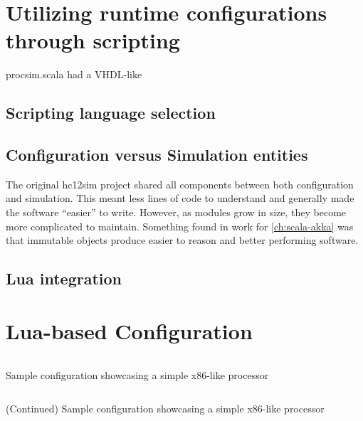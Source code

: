 \section{Utilizing runtime configurations through scripting}

procsim.scala had a VHDL-like


\subsection{Scripting language selection}
\lipsum[1]




\subsection{Configuration versus Simulation entities}

The original hc12sim project shared all components between both configuration and simulation. This meant less lines of code to understand and generally made the software ``easier'' to write. However, as modules grow in size, they become more complicated to maintain. Something found in work for \cref{ch:scala-akka} was that immutable objects produce easier to reason and better performing software.


\subsection{Lua integration}
\lipsum[1]

\section{Lua-based Configuration}

\lipsum[1]

\begin{listing}[hp!]
    \inputminted{lua}{./listings/x86_example.1.lua}
    \caption{Sample configuration showcasing a simple x86-like processor}
    \label{lst:lua:x86-example-1}
\end{listing}

\begin{listing*}[hp!]
    \inputminted[firstnumber=last]{lua}{./listings/x86_example.2.lua}
    \caption{(Continued) Sample configuration showcasing a simple x86-like processor}
    \label{lst:lua:x86-example-2}
\end{listing*}

